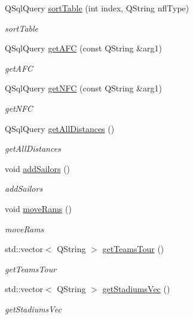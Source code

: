 \begin{DoxyCompactItemize}
Q\+Sql\+Query \hyperlink{class_database_a25d0f42914d6c1741bae914b5c335a8a}{sort\+Table} (int index, Q\+String nfl\+Type)
\begin{DoxyCompactList}\small\item\em sort\+Table \end{DoxyCompactList}\item 
Q\+Sql\+Query \hyperlink{class_database_a00061fa9ad27c4a877ca9dee9cccdfd2}{get\+A\+FC} (const Q\+String \&arg1)
\begin{DoxyCompactList}\small\item\em get\+A\+FC \end{DoxyCompactList}\item 
Q\+Sql\+Query \hyperlink{class_database_a7e2501d41331a1829a13349256cb1cda}{get\+N\+FC} (const Q\+String \&arg1)
\begin{DoxyCompactList}\small\item\em get\+N\+FC \end{DoxyCompactList}\item 
Q\+Sql\+Query \hyperlink{class_database_a41a013a764f486b48461516634efa80f}{get\+All\+Distances} ()
\begin{DoxyCompactList}\small\item\em get\+All\+Distances \end{DoxyCompactList}\item 
\mbox{\label{class_database_ada51be14418a56998d1609ec58a9f889}} 
void \hyperlink{class_database_ada51be14418a56998d1609ec58a9f889}{add\+Sailors} ()
\begin{DoxyCompactList}\small\item\em add\+Sailors \end{DoxyCompactList}\item 
\mbox{\label{class_database_ad674acc91ea0fe6118cf9785394f036a}} 
void \hyperlink{class_database_ad674acc91ea0fe6118cf9785394f036a}{move\+Rams} ()
\begin{DoxyCompactList}\small\item\em move\+Rams \end{DoxyCompactList}\item 
std\+::vector$<$ Q\+String $>$ \hyperlink{class_database_a58d31282aed93e50be29a8a447fd100e}{get\+Teams\+Tour} ()
\begin{DoxyCompactList}\small\item\em get\+Teams\+Tour \end{DoxyCompactList}\item 
std\+::vector$<$ Q\+String $>$ \hyperlink{class_database_a40f0c2887aca4a26932b11155315dcd8}{get\+Stadiums\+Vec} ()
\begin{DoxyCompactList}\small\item\em get\+Stadiums\+Vec \end{DoxyCompactList}\end{DoxyCompactItemize}
